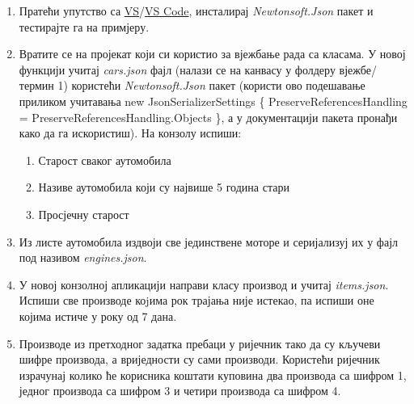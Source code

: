 \documentclass[11pt,a4paper]{article}
\begin{document}
\begin{enumerate}
\def\labelenumi{\arabic{enumi}.}
\setcounter{enumi}{7}
\item
  Пратећи упутство са
  \href{https://learn.microsoft.com/en-us/nuget/consume-packages/install-use-packages-visual-studio}{VS}/\href{https://docs.microsoft.com/en-us/nuget/quickstart/install-and-use-a-package-using-the-dotnet-cli}{VS
  Code}, инсталирај \emph{Newtonsoft.Json} пакет и тестирајте га на
  примјеру.
\item
  Вратите се на пројекат који си користио за вјежбање рада са класама. У
  новој функцији учитај \emph{cars.json} фајл (налази се на канвасу у
  фолдеру вјежбе/термин 1) користећи \emph{Newtonsoft.Json} пакет
  (користи ово подешавање приликом учитавања new JsonSerializerSettings
  \{ PreserveReferencesHandling = PreserveReferencesHandling.Objects \},
  а у документацији пакета пронађи како да га искористиш). На конзолу
  испиши:

  \begin{enumerate}
  \def\labelenumii{\alph{enumii}.}
  \item
    Старост сваког аутомобила
  \item
    Називе аутомобила који су највише 5 година стари
  \item
    Просјечну старост
  \end{enumerate}
\item
  Из листе аутомобила издвоји све јединствене моторе и серијализуј их у
  фајл под називом \emph{engines.json}.
\item
  У новој конзолној апликацији направи класу производ и учитај
  \emph{items.json}. Испиши све производе коjима рок трајања није
  истекао, па испиши оне којима истиче у року од 7 дана.
\item
  Производе из претходног задатка пребаци у ријечник тако да су кључеви
  шифре производа, а вриједности су сами производи. Користећи ријечник
  израчунај колико ће корисника коштати куповина два производа са шифром
  1, једног производа са шифром 3 и четири производа са шифром 4.
\end{enumerate}
\end{document}
